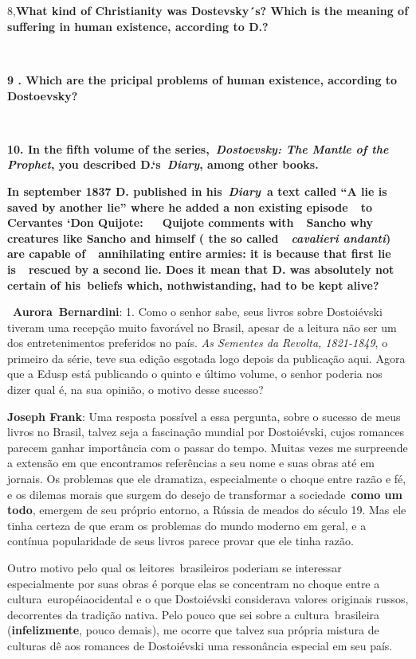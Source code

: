~

~

8,\textbf{What kind of Christianity was Dostevsky´s? Which is the
meaning of suffering in human existence, according to D.?}

\textbf{~}

\textbf{9 . Which are the pricipal problems of human existence,
according to Dostoevsky?}

\textbf{~}

\textbf{10. In the fifth volume of the series,~\emph{Dostoevsky: The
Mantle of the Prophet}, you described D.`s\emph{~Diary}, among other
books.}

\textbf{In september 1837 D. published in his~\emph{Diary}~a text called
``A lie is saved by another lie'' where he added a non existing
episode~~to Cervantes `Don Quijote:~~~Quijote comments with~~Sancho why
creatures like Sancho and himself ( the so called~~\emph{cavalieri
andanti}) are capable of~~annihilating entire armies: it is because that
first lie is~~rescued by a second lie. Does it mean that D. was
absolutely not certain of his~beliefs which, nothwistanding, had to be
kept alive?~~}

~\textbf{Aurora~Bernardini}: 1. Como o senhor sabe, seus livros sobre
Dostoiévski tiveram uma recepção muito favorável no Brasil, apesar de a
leitura não ser um dos entretenimentos preferidos no país. \emph{As Sementes
da Revolta, 1821-1849}, o primeiro da série, teve sua edição esgotada
logo depois da publicação aqui. Agora que a Edusp está publicando o
quinto e último volume, o senhor poderia nos dizer qual é, na sua
opinião, o motivo desse sucesso?

\textbf{Joseph Frank}: Uma resposta possível a essa pergunta, sobre o
sucesso de meus livros no Brasil, talvez seja a fascinação mundial por
Dostoiévski, cujos romances parecem ganhar importância com o passar do
tempo. Muitas vezes me surpreende a extensão em que encontramos
referências a seu nome e suas obras até em jornais. Os problemas que ele
dramatiza, especialmente o choque entre razão e fé, e os dilemas morais
que surgem do desejo de transformar a sociedade~\textbf{como um todo},
emergem de seu próprio entorno, a Rússia de meados do século 19. Mas ele
tinha certeza de que eram os problemas do mundo moderno em geral, e a
contínua popularidade de seus livros parece provar que ele tinha razão.

Outro motivo pelo qual os leitores~brasileiros poderiam se interessar
especialmente por suas obras é porque elas se concentram no choque entre
a cultura~européiaocidental e o que Dostoiévski considerava valores
originais russos, decorrentes da tradição nativa. Pelo pouco que sei
sobre a cultura~brasileira (\textbf{infelizmente}, pouco demais), me
ocorre que talvez sua própria mistura de culturas dê aos romances de
Dostoiévski uma ressonância especial em seu país.

